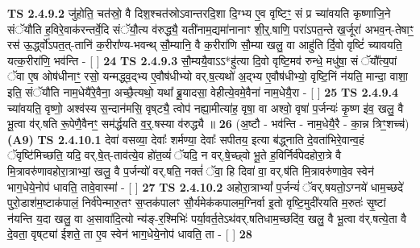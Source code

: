\documentclass[17pt]{extarticle}
\begin{document}
                  \newline
                                \textbf{ TS 2.4.9.2} \newline
                  जु॑होति॒ चत॑स्रो॒ वै दिश॒श्चत॑स्रोऽवान्तरदि॒शा दि॒ग्भ्य ए॒व वृष्टिꣳ॒॒ सं प्र च्या॑वयति कृष्णाजि॒ने संॅयौ॑ति ह॒विरे॒वाक॑रन्तर्वे॒दि संॅयौ॒त्य व॑रुद्ध्यै॒ यती॑नाम॒द्यमा॑नानाꣳ शी॒र्॒.षाणि॒ परा॑ऽपत॒न्ते ख॒र्जूरा॑ अभव॒न्-तेषाꣳ॒॒ रस॑ ऊ॒र्द्ध्वो॑ऽपत॒त्-तानि॑ क॒रीरा᳚ण्य-भवन्थ् सौ॒म्यानि॒ वै क॒रीरा॑णि सौ॒म्या खलु॒ वा आहु॑ति र्दि॒वो वृष्टिं॑ च्यावयति॒ यत्क॒रीरा॑णि॒ भव॑न्ति - [  ] \textbf{  24} \newline
                  \newline
                                \textbf{ TS 2.4.9.3} \newline
                  सौ॒म्ययै॒वाऽऽ*हु॑त्या दि॒वो वृष्टि॒मव॑ रुन्धे॒ मधु॑षा॒ सं ॅयौ᳚त्य॒पां ॅवा ए॒ष ओष॑धीनाꣳ॒॒ रसो॒ यन्मद्ध्व॒द्भ्य ए॒वौष॑धीभ्यो वर्.ष॒त्यथो॑ अ॒द्भ्य ए॒वौष॑धीभ्यो॒ वृष्टि॒निं न॑यति॒ मान्दा॒ वाशा॒ इति॒ संॅयौ॑ति नाम॒धेयै॑रे॒वैना॒ अच्छै॒त्यथो॒ यथा᳚ ब्रू॒यादसा॒ वेहीत्ये॒वमे॒वैना॑ नाम॒धेयै॒रा - [  ] \textbf{  25} \newline
                  \newline
                                \textbf{ TS 2.4.9.4} \newline
                  च्या॑वयति॒ वृष्णो॒ अश्व॑स्य स॒न्दान॑मसि॒ वृष्‌ट्यै॒ त्वोप॑ नह्या॒मीत्या॑ह॒ वृषा॒ वा अश्वो॒ वृषा॑ प॒र्जन्यः॑ कृ॒ष्ण इ॑व॒ खलु॒ वै भू॒त्वा व॑र्.षति रू॒पेणै॒वैनꣳ॒॒ सम॑र्द्धयति व॒र्॒.षस्या व॑रुद्ध्यै ॥ \textbf{  26} \newline
                  \newline
                      (अ॒ष्टौ - भव॑न्ति - नाम॒धेयै॒रै - का॒न्न त्रिꣳ॒॒शच्च॑)  \textbf{(A9)} \newline \newline
                                        \textbf{ TS 2.4.10.1} \newline
                  देवा॑ वसव्या॒ देवाः᳚ शर्मण्या॒ देवाः᳚ सपीतय॒ इत्या ब॑द्ध्नाति दे॒वता॑भिरे॒वान्व॒हं ॅवृष्टि॑मिच्छति॒ यदि॒ वर्.षे॒त्-ताव॑त्ये॒व हो॑त॒व्यं॑ ॅयदि॒ न वर्.षे॒च्छ्वो भू॒ते ह॒विर्निर्व॑पेदहोरा॒त्रे वै मि॒त्रावरु॑णावहोरा॒त्राभ्यां॒ खलु॒ वै प॒र्जन्यो॑ वर्.षति॒ नक्तं॑ ॅवा॒ हि दिवा॑ वा॒ वर्.ष॑ति मि॒त्रावरु॑णावे॒व स्वेन॑ भाग॒धेये॒नोप॑ धावति॒ तावे॒वास्मा॑ - [  ] \textbf{  27} \newline
                  \newline
                                \textbf{ TS 2.4.10.2} \newline
                  अहोरा॒त्राभ्यां᳚ प॒र्जन्यं॑ ॅवर्.षयतो॒ऽग्नये॑ धाम॒च्छदे॑ पुरो॒डाश॑म॒ष्टाक॑पालं॒ निर्व॑पेन्मारु॒तꣳ स॒प्तक॑पालꣳ सौ॒र्यमेक॑कपालम॒ग्निर्वा इ॒तो वृष्टि॒मुदी॑रयति म॒रुतः॑ सृ॒ष्टां न॑यन्ति य॒दा खलु॒ वा अ॒सावा॑दि॒त्यो न्य॑ङ्-र॒श्मिभिः॑ पर्या॒वर्त॒तेऽथ॑वर्.षतिधाम॒च्छदि॑व॒ खलु॒ वै भू॒त्वा व॑र्.षत्ये॒ता वै दे॒वता॒ वृष्‌ट्या॑ ईशते॒ ता ए॒व स्वेन॑ भाग॒धेये॒नोप॑ धावति॒ ता - [  ] \textbf{  28} \newline
\end{document}
